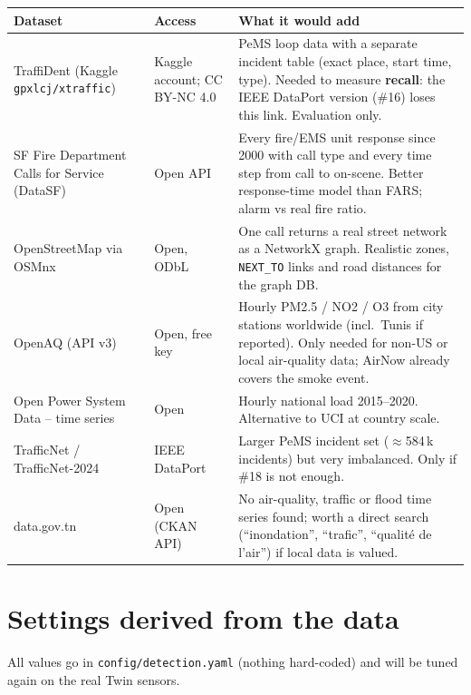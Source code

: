 \documentclass[10pt,a4paper]{article}
\newcommand{\code}[1]{\texttt{#1}}
\begin{document}
{\small
{}
\begin{longtable}{@{}L{4.2cm}L{3.2cm}L{8.6cm}@{}}
\toprule
\textbf{Dataset} & \textbf{Access} & \textbf{What it would add}\\
\midrule
\endhead
TraffiDent (Kaggle \code{gpxlcj/xtraffic}) & Kaggle account; CC BY-NC 4.0 & PeMS loop data with a separate incident table (exact place, start time, type). Needed to measure \textbf{recall}: the IEEE DataPort version (\#16) loses this link. Evaluation only.\\
SF Fire Department Calls for Service (DataSF) & Open API & Every fire/EMS unit response since 2000 with call type and every time step from call to on-scene. Better response-time model than FARS; alarm vs real fire ratio.\\
OpenStreetMap via OSMnx & Open, ODbL & One call returns a real street network as a NetworkX graph. Realistic zones, \code{NEXT\_TO} links and road distances for the graph DB.\\
OpenAQ (API v3) & Open, free key & Hourly PM2.5 / NO2 / O3 from city stations worldwide (incl.\ Tunis if reported). Only needed for non-US or local air-quality data; AirNow already covers the smoke event.\\
Open Power System Data -- time series & Open & Hourly national load 2015--2020. Alternative to UCI at country scale.\\
TrafficNet / TrafficNet-2024 & IEEE DataPort & Larger PeMS incident set ($\approx$584\,k incidents) but very imbalanced. Only if \#18 is not enough.\\
data.gov.tn & Open (CKAN API) & No air-quality, traffic or flood time series found; worth a direct search (``inondation'', ``trafic'', ``qualit\'e de l'air'') if local data is valued.\\
\bottomrule
\end{longtable}
}

\section{Settings derived from the data}\label{sec:settings}

All values go in \code{config/detection.yaml} (nothing hard-coded) and will be tuned again on the real Twin sensors.
\end{document}
